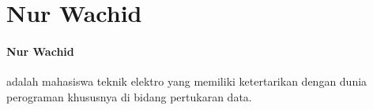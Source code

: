 \section*{Nur Wachid}

\paragraph{Nur Wachid} adalah mahasiswa teknik elektro yang memiliki
ketertarikan dengan dunia perograman khususnya di bidang pertukaran
data.